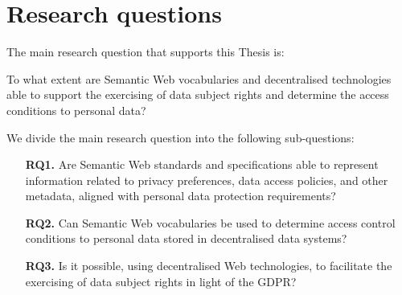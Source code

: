 \section{Research questions}
\label{sec:rqs}

The main research question that supports this Thesis is:

\begin{tcolorbox}[colback=royallavender!20]
To what extent are Semantic Web vocabularies and decentralised technologies able to support the exercising of data subject rights and determine the access conditions to personal data?
\end{tcolorbox}

We divide the main research question into the following sub-questions:

\begin{enumerate}
    \item [\textbf{RQ1.}] Are Semantic Web standards and specifications able to represent information related to privacy preferences, data access policies, and other metadata, aligned with personal data protection requirements?
    \item [\textbf{RQ2.}] Can Semantic Web vocabularies be used to determine access control conditions to personal data stored in decentralised data systems?
    \item [\textbf{RQ3.}] Is it possible, using decentralised Web technologies, to facilitate the exercising of data subject rights in light of the GDPR?
\end{enumerate}
